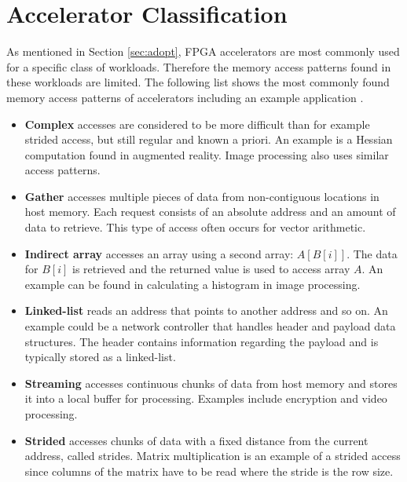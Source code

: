 \section{Accelerator Classification}
\label{sec:class}
As mentioned in Section \ref{sec:adopt}, FPGA accelerators are most commonly used for a specific class of workloads. Therefore the memory access patterns found in these workloads are limited. The following list shows the most commonly found memory access patterns of accelerators including an example application \cite{li-mem-access}.
\begin{itemize}
  \item{\textbf{Complex} accesses are considered to be more difficult than for example strided access, but still regular and known a priori. An example is a Hessian computation found in augmented reality. Image processing also uses similar access patterns.}
  \item{\textbf{Gather} accesses multiple pieces of data from non-contiguous locations in host memory. Each request consists of an absolute address and an amount of data to retrieve. This type of access often occurs for vector arithmetic.}
  \item{\textbf{Indirect array} accesses an array using a second array: $A[B[i]]$. The data for $B[i]$ is retrieved and the returned value is used to access array $A$. An example can be found in calculating a histogram in image processing.}
  \item{\textbf{Linked-list} reads an address that points to another address and so on. An example could be a network controller that handles header and payload data structures. The header contains information regarding the payload and is typically stored as a linked-list.}
  \item{\textbf{Streaming} accesses continuous chunks of data from host memory and stores it into a local buffer for processing. Examples include encryption and video processing.}
  \item{\textbf{Strided} accesses chunks of data with a fixed distance from the current address, called strides. Matrix multiplication is an example of a strided access since columns of the matrix have to be read where the stride is the row size.}
\end{itemize}


